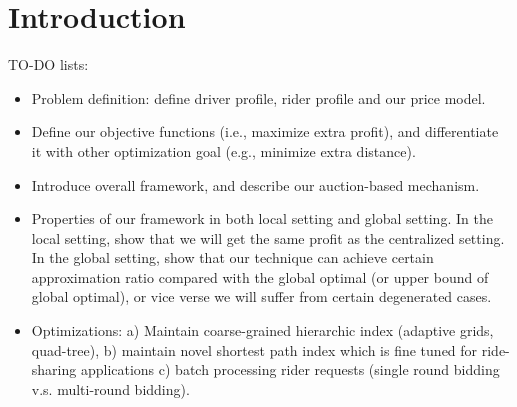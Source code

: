 \section{Introduction}

TO-DO lists:
\begin{itemize}
	\item Problem definition: define driver profile, rider profile and our price model.
	
	\item Define our objective functions (i.e., maximize extra profit), and differentiate it with other optimization goal (e.g., minimize extra distance). 
	
	\item Introduce overall framework, and describe our auction-based mechanism.
	
	\item Properties of our framework in both local setting and global setting. In the local setting, show that we will get the same profit as the centralized setting. In the global setting, show that our technique can achieve certain approximation ratio compared with the global optimal (or upper bound of global optimal),  or vice verse we will suffer from certain degenerated cases.
	
	\item Optimizations: a) Maintain coarse-grained hierarchic index (adaptive grids, quad-tree), b) maintain novel shortest path index which is fine tuned for ride-sharing applications c) batch processing rider requests (single round bidding v.s. multi-round bidding).
	
\end{itemize}